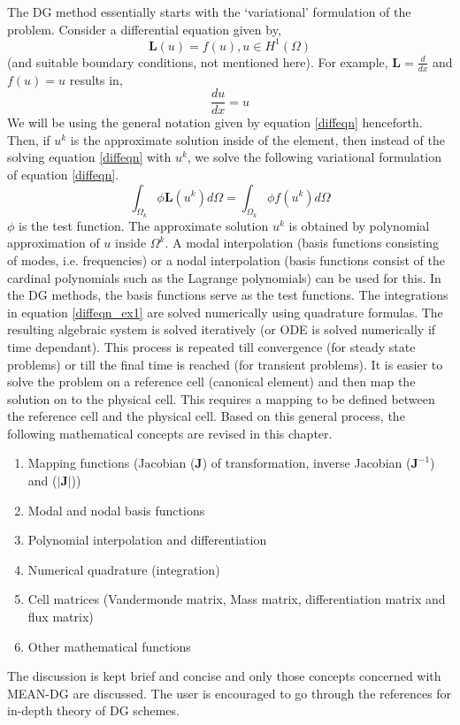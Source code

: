 The DG method essentially starts with the `variational' formulation of the problem. Consider a 
differential equation given by,
\begin{equation}\label{diffeqn}
	\mathbf{L}(u) = f(u),  u\in{H^1(\Omega)}
\end{equation}
(and suitable boundary conditions, not mentioned here).
For example, $\mathbf{L} = \frac{d}{dx}$ and $f(u) = u$ results in,
\begin{equation}\label{diffeqn_ex1}
	\frac{du}{dx} = u
\end{equation}
We will be using the general notation given by equation \ref{diffeqn} henceforth.
Then, if $u^k$ is the approximate solution inside of the element, then instead of the solving equation \ref{diffeqn}
with $u^k$, we solve the following variational formulation of equation \ref{diffeqn}.
\begin{equation}\label{diffeqnvr}
	\int_{\Omega_k} \phi \mathbf{L}(u^k) d\Omega = 	\int_{\Omega_k} \phi f(u^k) d\Omega
\end{equation}
$\phi$ is the test function. The approximate solution $u^k$ is obtained by polynomial approximation of $u$ inside $\Omega^k$.
A modal interpolation (basis functions consisting of modes, i.e. frequencies) or a nodal interpolation (basis functions
consist of the cardinal polynomials such as the Lagrange polynomials) can be used for this. 
In the DG methods, the basis functions serve as the test functions. 
The integrations in equation \ref{diffeqn_ex1} are solved numerically using quadrature formulas. 
The resulting algebraic system is solved iteratively (or ODE is solved numerically if time dependant).
This process is repeated till convergence (for steady state
problems) or till the final time is reached (for transient problems). 
It is easier to solve the problem on a reference cell (canonical element) and then map the solution on to the physical cell.
This requires a mapping to be defined between the reference cell and the physical cell.
Based on this general process, the following mathematical concepts are revised in this chapter.
\begin{enumerate}
	\item Mapping functions (Jacobian ($\mathbf{J}$) of transformation, inverse Jacobian ($\mathbf{J}^{-1}$) and ($|\mathbf{J}|$))
	\item Modal and nodal basis functions  
	\item Polynomial interpolation and differentiation
	\item Numerical quadrature (integration)
	\item Cell matrices (Vandermonde matrix, Mass matrix, differentiation matrix and flux matrix)
	\item Other mathematical functions 
\end{enumerate}
The discussion is kept brief and concise and only those concepts concerned with MEAN-DG are discussed. 
The user is encouraged to go through the references for in-depth theory of DG schemes.

